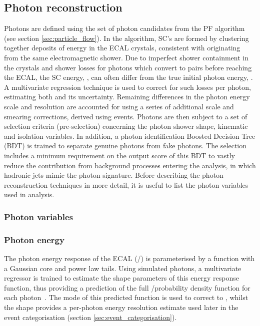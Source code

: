 \subsection{Photon reconstruction}
Photons are defined using the set of photon candidates from the PF algorithm (see section \ref{sec:particle_flow}). In the algorithm, SC's are formed by clustering together deposits of energy in the ECAL crystals, consistent with originating from the same electromagnetic shower. Due to imperfect shower containment in the crystals and shower losses for photons which convert to \ee pairs before reaching the ECAL, the SC energy, \Eraw, can often differ from the true initial photon energy, \Etrue. A multivariate regression technique is used to correct for such losses per photon, estimating both \Etrue and its uncertainty. Remaining differences in the photon energy scale and resolution are accounted for using a series of additional scale and smearing corrections, derived using \Zee events. Photons are then subject to a set of selection criteria (pre-selection) concerning the photon shower shape, kinematic and isolation variables. In addition, a photon identification Boosted Decision Tree (BDT) is trained to separate genuine photons from fake photons. The selection includes a minimum requirement on the output score of this BDT to vastly reduce the contribution from background processes entering the analysis, in which hadronic jets mimic the photon signature. Before describing the photon reconstruction techniques in more detail, it is useful to list the photon variables used in \Hgg analysis.

\subsubsection{Photon variables}

\subsubsection{Photon energy}
The photon energy response of the ECAL (\Etrue/\Eraw) is parameterised by a function with a Gaussian core and power law tails. Using simulated photons, a multivariate regressor is trained to estimate the shape parameters of this energy response function, thus providing a prediction of the full \Etrue/\Eraw probability density function for each photon~\cite{}. The mode of this predicted function is used to correct \Eraw to \Etrue, whilst the shape provides a per-photon energy resolution estimate used later in the event categorisation (section \ref{sec:event_categorisation}).

